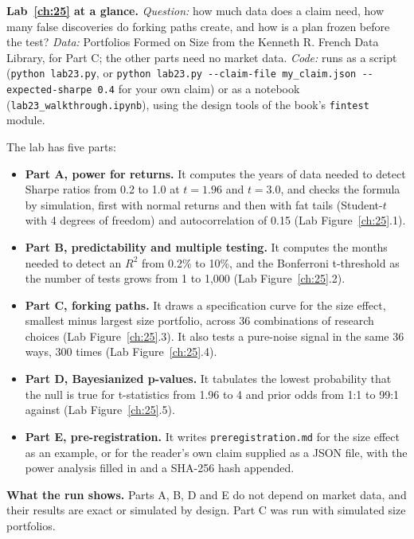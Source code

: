 \begin{callout}
\textbf{Lab~\ref{ch:25} at a glance.} \emph{Question:} how much data does a claim need, how many false discoveries do forking paths create, and how is a plan frozen before the test? \emph{Data:} Portfolios Formed on Size from the Kenneth R. French Data Library, for Part C; the other parts need no market data. \emph{Code:} runs as a script (\texttt{python lab23.py}, or \texttt{python lab23.py -{}-claim-file my\_claim.json -{}-expected-sharpe 0.4} for your own claim) or as a notebook (\texttt{lab23\_walkthrough.ipynb}), using the design tools of the book's \texttt{fintest} module.
\end{callout}

The lab has five parts:

\begin{itemize}
  \item \textbf{Part A, power for returns.} It computes the years of data needed to detect Sharpe ratios from 0.2 to 1.0 at $t = 1.96$ and $t = 3.0$, and checks the formula by simulation, first with normal returns and then with fat tails (Student-$t$ with 4 degrees of freedom) and autocorrelation of 0.15 (Lab Figure~\ref{ch:25}.1).
  \item \textbf{Part B, predictability and multiple testing.} It computes the months needed to detect an $R^2$ from 0.2\% to 10\%, and the Bonferroni t-threshold as the number of tests grows from 1 to 1,000 (Lab Figure~\ref{ch:25}.2).
  \item \textbf{Part C, forking paths.} It draws a specification curve for the size effect, smallest minus largest size portfolio, across 36 combinations of research choices (Lab Figure~\ref{ch:25}.3). It also tests a pure-noise signal in the same 36 ways, 300 times (Lab Figure~\ref{ch:25}.4).
  \item \textbf{Part D, Bayesianized p-values.} It tabulates the lowest probability that the null is true for t-statistics from 1.96 to 4 and prior odds from 1:1 to 99:1 against (Lab Figure~\ref{ch:25}.5).
  \item \textbf{Part E, pre-registration.} It writes \texttt{preregistration.md} for the size effect as an example, or for the reader's own claim supplied as a JSON file, with the power analysis filled in and a SHA-256 hash appended.
\end{itemize}

\textbf{What the run shows.} Parts A, B, D and E do not depend on market data, and their results are exact or simulated by design. Part C was run with simulated size portfolios.

